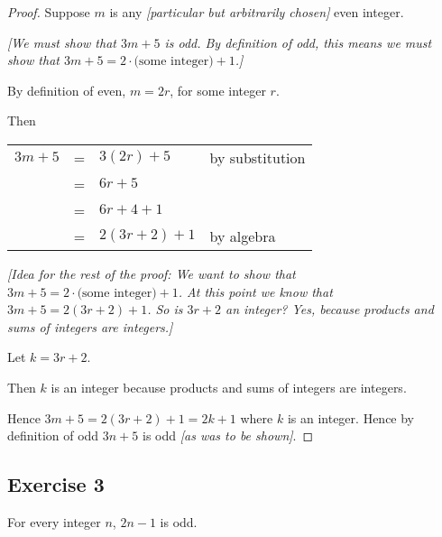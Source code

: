 \documentclass[14pt]{extarticle}
\newcommand{\cy}{\color{cyan}}
\begin{document}
\begin{proof}
    Suppose $m$ is any {\it [particular but arbitrarily chosen]} even integer.

        {\it [We must show that $3m + 5$ is odd. By definition of odd, this means we must show that $3m + 5 = 2\cdot\text{(some integer)} + 1$.]}

    By definition of even, $m = 2r$, for some integer $r$.

    Then

    \begin{center}
        \begin{tabular}{rcll}
            $3m + 5$ & = & $3(2r) + 5$     & \cy by substitution \\
                     & = & $6r + 5$        &                     \\
                     & = & $6r + 4 + 1$    &                     \\
                     & = & $2(3r + 2) + 1$ & \cy by algebra      \\
        \end{tabular}
    \end{center}

    {\it [Idea for the rest of the proof: We want to show that $3m + 5 = 2\cdot\text{(some integer)} + 1$. At this point we know that $3m + 5 = 2(3r + 2) + 1$. So is $3r + 2$ an integer? Yes, because products and sums of integers are integers.]}

    Let $k = 3r + 2$.

    Then $k$ is an integer because products and sums of integers are integers.

    Hence $3m + 5 = 2(3r+2) + 1 = 2k + 1$ where $k$ is an integer. Hence by definition of odd $3n+5$ is odd {\it [as was to be shown]}.
\end{proof}

\subsection{Exercise 3}
For every integer $n$, $2n - 1$ is odd.
\end{document}
